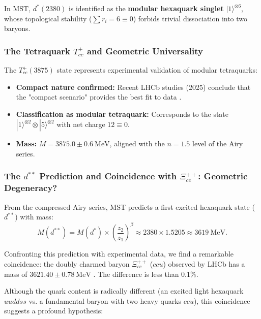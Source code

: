 \documentclass[11pt, a4paper]{article}
\theoremstyle{plain}
\theoremstyle{definition}
\begin{document}
In MST, $d^*(2380)$ is identified as the \textbf{modular hexaquark singlet} $|1\rangle^{\otimes 6}$, whose topological stability ($\sum r_i = 6 \equiv 0$) forbids trivial dissociation into two baryons.

\subsubsection{The Tetraquark \texorpdfstring{$T_{cc}^+$}{Tcc+} and Geometric Universality}

The $T_{cc}^+(3875)$ state represents experimental validation of modular tetraquarks:

\begin{itemize}
    \item \textbf{Compact nature confirmed:} Recent LHCb studies (2025) conclude that the "compact scenario" provides the best fit to data \cite{Harada2025}.
    
    \item \textbf{Classification as modular tetraquark:} Corresponds to the state $|1\rangle^{\otimes 2} \otimes |5\rangle^{\otimes 2}$ with net charge $12 \equiv 0$.
    
    \item \textbf{Mass:} $M = 3875.0 \pm 0.6\ \si{\mega\electronvolt}$, aligned with the $n=1.5$ level of the Airy series.
\end{itemize}

\subsubsection{The \texorpdfstring{$d^{**}$}{d**} Prediction and Coincidence with \texorpdfstring{$\Xi_{cc}^{++}$}{Ξcc++}: Geometric Degeneracy?}
\label{subsec:dstarstar_coincidence}

From the compressed Airy series, MST predicts a first excited hexaquark state ($d^{**}$) with mass:
\begin{equation}
M(d^{**}) = M(d^*) \times \left(\frac{z_2}{z_1}\right)^\beta \approx 2380 \times 1.5205 \approx 3619\ \si{\mega\electronvolt}.
\end{equation}

Confronting this prediction with experimental data, we find a remarkable coincidence: the doubly charmed baryon $\Xi_{cc}^{++}$ ($ccu$) observed by LHCb has a mass of $3621.40 \pm 0.78\ \si{\mega\electronvolt}$ \cite{LHCb2017_Xicc}. The difference is less than $0.1\%$.

Although the quark content is radically different (an excited light hexaquark $uuddss$ vs. a fundamental baryon with two heavy quarks $ccu$), this coincidence suggests a profound hypothesis:
\end{document}

